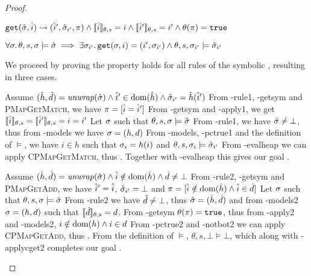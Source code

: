 \begin{proof}


\pfassume \begin{hypvlist}
 $\texttt{get}(\hat{\sigma},\hat{i})\rightsquigarrow(\hat{i}', \hat{\sigma}_{i'}, \pi) \land \llbracket\hat{i}\rrbracket_{\theta,s}=i \land \llbracket\hat{i}'\rrbracket_{\theta,s}=i' \land \theta(\pi)=\texttt{true} $
\end{hypvlist}
\pfprove \begin{goalvlist}
 $\forall \sigma\ldotp \theta,s,\sigma \models \hat{\sigma} \implies \exists \sigma_{i'} \ldotp \texttt{get}(\sigma, i)=(i', \sigma_{i'}) \land \theta,s,\sigma_{i'} \models \hat{\sigma}_{i'}$
\end{goalvlist}

We proceed by proving the property holds for all rules of the symbolic , resulting in three cases.


\begin{hypvlist}
 Assume $(\hat{h},\hat{d})=\operatorname{\mathit{unwrap}}(\hat{\sigma}) \land \hat{i}'\in\operatorname{dom}(\hat{h}) \land \hat{\sigma}_{i'}=\hat{h}(\hat{i}')$
 From \hyp{rule1}, \hyp{getsym} and \textsc{PMapGetMatch}, we have $\pi=[\hat{i}=\hat{i}']$
 From \hyp{getsym} and \hyp{apply1}, we get $\llbracket\hat{i}\rrbracket_{\theta,s} = \llbracket\hat{i}'\rrbracket_{\theta,s} = i = i'$
 Let $\sigma$ such that $\theta,s,\sigma\models\hat{\sigma}$
 From \hyp{rule1}, we have $\hat{\sigma}\neq\bot$, thus from \hyp{models} we have $\sigma=(h, d)$
 From \hyp{models}, \hyp{pctrue1} and the definition of $\models$, we have $i\in h$ such that $\sigma_i=h(i)$ and ${\theta,s,\sigma_i\models\hat{\sigma}_{i'}}$
 From \hyp{evalheap} we can apply \textsc{CPMapGetMatch}, thus . Together with \hyp{evalheap} this gives our goal .
\end{hypvlist}


\begin{hypvlist}
 Assume $(\hat{h},\hat{d})=\operatorname{\mathit{unwrap}}(\hat{\sigma}) \land \hat{i}\notin\operatorname{dom}(\hat{h}) \land \hat{d}\neq\bot$
 From \hyp{rule2}, \hyp{getsym} and \textsc{PMapGetAdd}, we have $\hat{i}'=\hat{i}$, $\hat{\sigma}_{i'}=\bot$ and ${\pi=[\hat{i}\notin \operatorname{dom}(\hat{h})\land \hat{i} \in \hat{d}]}$%
 Let $\sigma$ such that $\theta,s,\sigma\models\hat{\sigma}$
 From \hyp{rule2} we have $\hat{d}\neq\bot$, thus $\hat{\sigma}=(\hat{h},\hat{d})$ and from \hyp{models2} $\sigma=(h,d)$ such that $\llbracket\hat{d}\rrbracket_{\theta,s} = d$.
 From \hyp{getsym} $\theta(\pi)=\texttt{true}$, thus from \hyp{apply2} and \hyp{models2}, $i\notin \operatorname{dom}(h) \land i\in d$
 From \hyp{pctrue2} and \hyp{notbot2} we can apply \textsc{CPMapGetAdd}, thus .
 From the definition of $\models$, $\theta,s,\bot\models\bot$, which along with \hyp{applycget2} completes our goal .
\end{hypvlist}


\end{proof}
